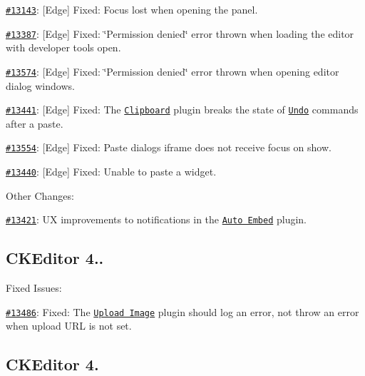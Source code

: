\begin{DoxyItemize}
\item \href{http://dev.ckeditor.com/ticket/13143}{\tt \#13143}\+: \mbox{[}Edge\mbox{]} Fixed\+: Focus lost when opening the panel.
\item \href{http://dev.ckeditor.com/ticket/13387}{\tt \#13387}\+: \mbox{[}Edge\mbox{]} Fixed\+: \char`\"{}\+Permission denied\char`\"{} error thrown when loading the editor with developer tools open.
\item \href{http://dev.ckeditor.com/ticket/13574}{\tt \#13574}\+: \mbox{[}Edge\mbox{]} Fixed\+: \char`\"{}\+Permission denied\char`\"{} error thrown when opening editor dialog windows.
\item \href{http://dev.ckeditor.com/ticket/13441}{\tt \#13441}\+: \mbox{[}Edge\mbox{]} Fixed\+: The \href{http://ckeditor.com/addon/clipboard}{\tt Clipboard} plugin breaks the state of \href{http://ckeditor.com/addon/undo}{\tt Undo} commands after a paste.
\item \href{http://dev.ckeditor.com/ticket/13554}{\tt \#13554}\+: \mbox{[}Edge\mbox{]} Fixed\+: Paste dialog\textquotesingle{}s iframe does not receive focus on show.
\item \href{http://dev.ckeditor.com/ticket/13440}{\tt \#13440}\+: \mbox{[}Edge\mbox{]} Fixed\+: Unable to paste a widget.
\end{DoxyItemize}

Other Changes\+:


\begin{DoxyItemize}
\item \href{http://dev.ckeditor.com/ticket/13421}{\tt \#13421}\+: UX improvements to notifications in the \href{http://ckeditor.com/addon/autoembed}{\tt Auto Embed} plugin.
\end{DoxyItemize}

\subsection*{C\+K\+Editor 4..}

Fixed Issues\+:


\begin{DoxyItemize}
\item \href{http://dev.ckeditor.com/ticket/13486}{\tt \#13486}\+: Fixed\+: The \href{http://ckeditor.com/addon/uploadimage}{\tt Upload Image} plugin should log an error, not throw an error when upload U\+RL is not set.
\end{DoxyItemize}

\subsection*{C\+K\+Editor 4.}

